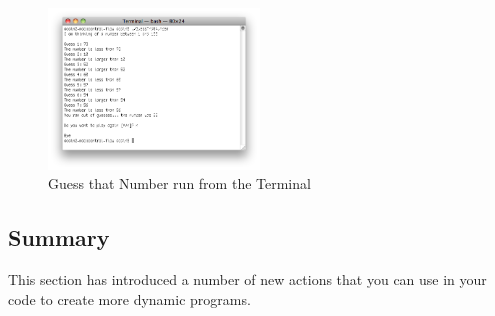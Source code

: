 \begin{figure}[h]
   \centering
   \includegraphics[width=0.5\textwidth]{./topics/control-flow/images/GuessThatNumber} 
   \caption[Guess That Number Terminal]{Guess that Number run from the Terminal}
   \label{fig:control-flow-guess-num}
\end{figure}





















\clearpage
\subsection{Summary} %
\label{sub:control_flow_summary}

This section has introduced a number of new actions that you can use in your code to create more dynamic programs. 

